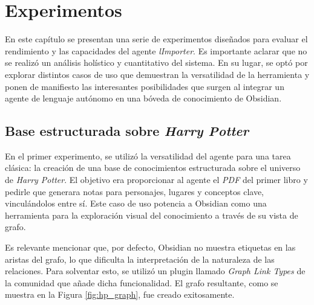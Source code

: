 \chapter{Experimentos}\label{chapter:implementation}
En este capítulo se presentan una serie de experimentos diseñados para evaluar el rendimiento y las capacidades del agente \textit{lImporter}. Es importante aclarar que no se realizó un análisis holístico y cuantitativo del sistema. En su lugar, se optó por explorar distintos casos de uso que demuestran la versatilidad de la herramienta y ponen de manifiesto las interesantes posibilidades que surgen al integrar un agente de lenguaje autónomo en una bóveda de conocimiento de Obsidian.

\section{Base estructurada sobre \textit{Harry Potter}}
En el primer experimento, se utilizó la versatilidad del agente para una tarea clásica: la creación de una base de conocimientos estructurada sobre el universo de \textit{Harry Potter}. El objetivo era proporcionar al agente el \textit{PDF} del primer libro y pedirle que generara notas para personajes, lugares y conceptos clave, vinculándolos entre sí. Este caso de uso potencia a Obsidian como una herramienta para la exploración visual del conocimiento a través de su vista de grafo.

Es relevante mencionar que, por defecto, Obsidian no muestra etiquetas en las aristas del grafo, lo que dificulta la interpretación de la naturaleza de las relaciones. Para solventar esto, se utilizó un plugin llamado \textit{Graph Link Types} de la comunidad que añade dicha funcionalidad. El grafo resultante, como se muestra en la Figura \ref{fig:hp_graph}, fue creado exitosamente. 

